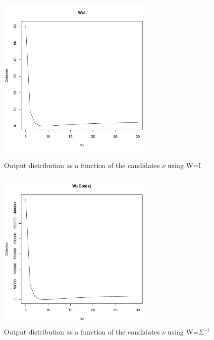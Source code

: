 \begin{figure}\label{t-returns_criterion}
    \centering
    \includegraphics[width=0.7\textwidth]{t-returns_criterion_(W=I).pdf}
    \caption{Output distribution as a function of the candidates $\nu$ using W=I}
    \includegraphics[width=0.7\textwidth]{t-returns_criterion_(W=Sigma^-1).pdf}
    \caption{Output distribution as a function of the candidates $\nu$ using W=$\Sigma^{-1}$}
\end{figure}


